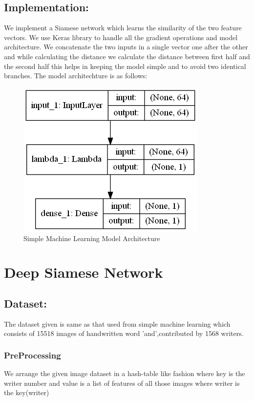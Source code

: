 \documentclass{article}
\begin{document}
\subsection{Implementation:}
    We implement a Siamese network which learns the similarity of the two feature vectors.
    We use Keras library to handle all the gradient operations and model architecture. We concatenate the two inputs in a single vector one after the other and while calculating the distance we calculate the distance between first half and the second half this helps in keeping the model simple and to avoid two identical branches.
    The model architechture is as follows:
    \begin{figure}[h]
  \begin{minipage}{0.8\textwidth}
  \centering
  \includegraphics[scale=0.5]{model.png}
  \caption{Simple Machine Learning Model Architecture}
  \end{minipage}\hfill
  
\end{figure}
\section{Deep Siamese Network}
\subsection{Dataset:}
The dataset given is same as that used from simple machine learning which consists of 15518 images of handwritten word 'and',contributed by 1568 writers.
\subsubsection{PreProcessing}
        We arrange the given image dataset in a hash-table like fashion where key is the writer number and value is a list of features of all those images where writer is the key(writer) 
\end{document}
